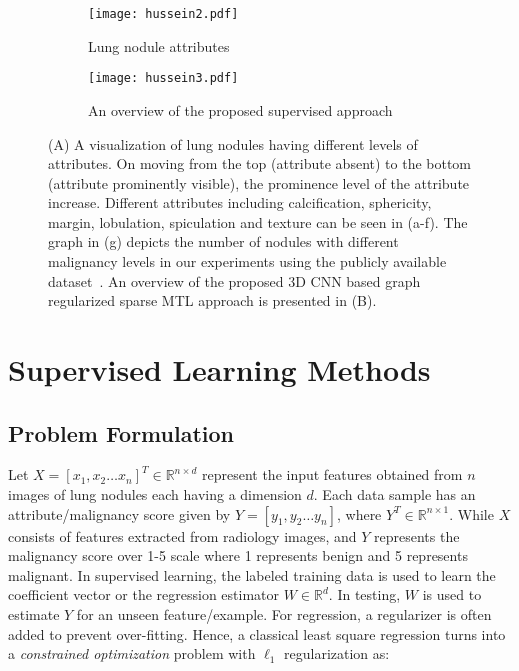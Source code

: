 \documentclass[journal]{IEEEtran}
\begin{document}
\begin{figure*}[t]
	\begin{subfigure}[c]{0.30\textwidth}
    \hspace{-0.25 cm}
    \centering
	\texttt{[image: hussein2.pdf]}
    \caption{Lung nodule attributes}
    \end{subfigure}
    \begin{subfigure}[c]{0.75\textwidth}
    \centering
	\texttt{[image: hussein3.pdf]}
    \caption{An overview of the proposed supervised approach}
    \end{subfigure}
    \caption{(A) A visualization of lung nodules having different levels of attributes. On moving from the top (attribute absent) to the bottom (attribute prominently visible), the prominence level of the attribute increase. Different attributes including calcification, sphericity, margin, lobulation, spiculation and texture can be seen in (a-f). The graph in (g) depicts the number of nodules with different malignancy levels in our experiments using the publicly available dataset~\cite{armato2011lung}. An overview of the proposed 3D CNN based graph regularized sparse MTL approach is presented in (B).}
  \label{fig:supworkflow}

\end{figure*} 

\section{Supervised Learning Methods}
\subsection{Problem Formulation}
Let $X=[x_1,x_2 \dots x_n]^T\in\mathbb{R}^{n \times d}$ represent the input features obtained from $n$ images of lung nodules each having a dimension $d$. %
Each data sample has an attribute/malignancy score given by $Y=[y_1,y_2 \dots y_n]$, where $Y^T\in \mathbb{R}^{n \times 1}$. While $X$ consists of features extracted from radiology images, and $Y$ represents the malignancy score over 1-5 scale where 1 represents benign and 5 represents malignant. In supervised learning, the labeled training data is used to learn the coefficient vector or the regression estimator $W\in\mathbb{R}^d$. In testing, $W$ is used to estimate $Y$ for an unseen feature/example. For regression, a regularizer is often added to prevent over-fitting. Hence, a classical least square regression turns into a \emph{constrained optimization} problem with $\ell_1$ regularization as:
\end{document}
